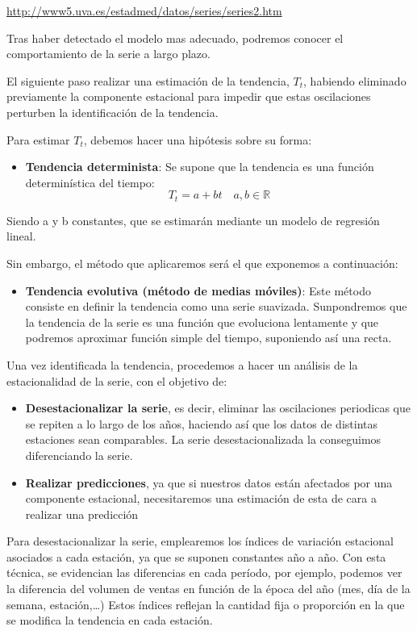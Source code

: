 \documentclass[12pt,a4paper,]{book}
\providecommand{\tightlist}{%
  \setlength{\itemsep}{0pt}\setlength{\parskip}{0pt}}
\numberwithin{dummy}{section}
\theoremstyle{ocrenumbox}
\theoremstyle{blacknumex}
\theoremstyle{blacknumbox}
\theoremstyle{ocrenum}
\theoremstyle{ocrenum}
\begin{document}
\url{http://www5.uva.es/estadmed/datos/series/series2.htm}

Tras haber detectado el modelo mas adecuado, podremos conocer el
comportamiento de la serie a largo plazo.

El siguiente paso realizar una estimación de la tendencia, \(T_t\),
habiendo eliminado previamente la componente estacional para impedir que
estas oscilaciones perturben la identificación de la tendencia.

Para estimar \(T_t\), debemos hacer una hipótesis sobre su forma:

\begin{itemize}
\tightlist
\item
  \textbf{Tendencia determinista}: Se supone que la tendencia es una
  función determinística del tiempo:
  \[T_t = a + bt \quad a,b\in \mathbb R\]
\end{itemize}

Siendo a y b constantes, que se estimarán mediante un modelo de
regresión lineal.

Sin embargo, el método que aplicaremos será el que exponemos a
continuación:

\begin{itemize}
\tightlist
\item
  \textbf{Tendencia evolutiva (método de medias móviles)}: Este método
  consiste en definir la tendencia como una serie suavizada.
  Sunpondremos que la tendencia de la serie es una función que
  evoluciona lentamente y que podremos aproximar función simple del
  tiempo, suponiendo así una recta.
\end{itemize}

Una vez identificada la tendencia, procedemos a hacer un análisis de la
estacionalidad de la serie, con el objetivo de:

\begin{itemize}
\item
  \textbf{Desestacionalizar la serie}, es decir, eliminar las
  oscilaciones periodicas que se repiten a lo largo de los años,
  haciendo así que los datos de distintas estaciones sean comparables.
  La serie desestacionalizada la conseguimos diferenciando la serie.
\item
  \textbf{Realizar predicciones}, ya que si nuestros datos están
  afectados por una componente estacional, necesitaremos una estimación
  de esta de cara a realizar una predicción
\end{itemize}

Para desestacionalizar la serie, emplearemos los índices de variación
estacional asociados a cada estación, ya que se suponen constantes año a
año. Con esta técnica, se evidencian las diferencias en cada período,
por ejemplo, podemos ver la diferencia del volumen de ventas en función
de la época del año (mes, día de la semana, estación,\ldots) Estos
índices reflejan la cantidad fija o proporción en la que se modifica la
tendencia en cada estación.
\end{document}
